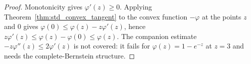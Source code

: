 \begin{proof}
\leanok
Monotonicity gives $\varphi'(z) \ge 0$. Applying Theorem~\ref{thm:std_convex_tangent} to the convex function $-\varphi$ at the points $z$ and $0$ gives $\varphi(0) \le \varphi(z) - z \varphi'(z)$, hence $z \varphi'(z) \le \varphi(z) - \varphi(0) \le \varphi(z)$. The companion estimate $-z\varphi''(z) \le 2\varphi'(z)$ is not covered: it fails for $\varphi(z) = 1 - e^{-z}$ at $z = 3$ and needs the complete-Bernstein structure.
\end{proof}

